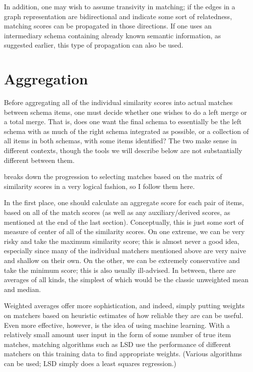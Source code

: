 \documentclass{article}
\theoremstyle{definition}
\theoremstyle{remark}
\begin{document}
In addition, one may wish to assume transivity in matching; if the edges in a graph representation are bidirectional and indicate some sort of relatedness, matching scores can be propagated in those directions. If one uses an intermediary schema containing already known semantic information, as suggested earlier, this type of propagation can also be used.

\section{Aggregation}

Before aggregating all of the individual similarity scores into actual matches between schema items, one must decide whether one wishes to do a left merge or a total merge. That is, does one want the final schema to essentially be the left schema with as much of the right schema integrated as possible, or a collection of all items in both schemas, with some items identified? The two make sense in different contexts, though the tools we will describe below are not substantially different between them.

\cite{coma} breaks down the progression to selecting matches based on the matrix of similarity scores in a very logical fashion, so I follow them here. 

In the first place, one should calculate an aggregate score for each pair of items, based on all of the match scores (as well as any auxiliary/derived scores, as mentioned at the end of the last section). Conceptually, this is just some sort of measure of center of all of the similarity scores. On one extreme, we can be very risky and take the maximum similarity score; this is almost never a good idea, especially since many of the individual matchers mentioned above are very naive and shallow on their own. On the other, we can be extremely conservative and take the minimum score; this is also usually ill-advised. In between, there are averages of all kinds, the simplest of which would be the classic unweighted mean and median. 

Weighted averages offer more sophistication, and indeed, simply putting weights on matchers based on heuristic estimates of how reliable they are can be useful. Even more effective, however, is the idea of using machine learning. With a relatively small amount user input in the form of some number of true item matches, matching algorithms such as LSD \cite{machine} use the performance of different matchers on this training data to find appropriate weights. (Various algorithms can be used; LSD simply does a least squares regression.) 
\end{document}
